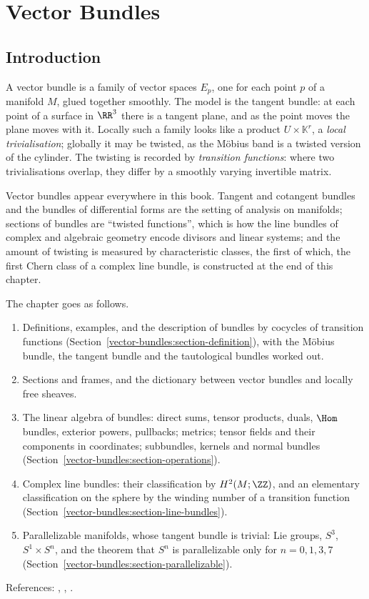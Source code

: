 \chapter{Vector Bundles}\label{vector-bundles}

\section{Introduction}\label{vector-bundles:section-introduction}

A vector bundle is a family of vector spaces $E_p$, one for each point $p$ of a manifold $M$, glued together smoothly. The model is the tangent bundle: at each point of a
surface in $\RR^3$ there is a tangent plane, and as the point moves the plane moves with it. Locally such a family looks like a product $U \times \mathbb{K}^r$, a
\emph{local trivialisation}; globally it may be twisted, as the M\"obius band is a twisted version of the cylinder. The twisting is recorded by \emph{transition functions}:
where two trivialisations overlap, they differ by a smoothly varying invertible matrix.

Vector bundles appear everywhere in this book. Tangent and cotangent bundles and the bundles of differential forms are the setting of analysis on manifolds; sections of
bundles are ``twisted functions'', which is how the line bundles of complex and algebraic geometry encode divisors and linear systems; and the amount of twisting is measured
by characteristic classes, the first of which, the first Chern class of a complex line bundle, is constructed at the end of this chapter.

The chapter goes as follows.
\begin{enumerate}
\item Definitions, examples, and the description of bundles by cocycles of transition functions (Section~\ref{vector-bundles:section-definition}), with the M\"obius bundle,
the tangent bundle and the tautological bundles worked out.
\item Sections and frames, and the dictionary between vector bundles and locally free sheaves.
\item The linear algebra of bundles: direct sums, tensor products, duals, $\Hom$ bundles, exterior powers, pullbacks; metrics; tensor fields and their components in coordinates; subbundles, kernels and normal bundles
(Section~\ref{vector-bundles:section-operations}).
\item Complex line bundles: their classification by $H^2(M; \ZZ)$, and an elementary classification on the sphere by the winding number of a transition function
(Section~\ref{vector-bundles:section-line-bundles}).
\item Parallelizable manifolds, whose tangent bundle is trivial: Lie groups, $S^3$, $S^1 \times S^n$, and the theorem that $S^n$ is parallelizable only for $n = 0, 1, 3, 7$
(Section~\ref{vector-bundles:section-parallelizable}).
\end{enumerate}
References: \cite{lee-smooth-manifolds}, \cite{milnor-stasheff}, \cite[Chapter 0]{griffiths-harris}.


